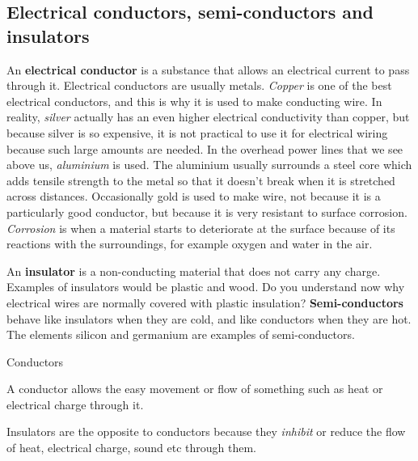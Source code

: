             \subsection{ Electrical conductors, semi-conductors and insulators}
            \nopagebreak
            \label{m38706*id66058}An \textbf{electrical conductor} is a substance that allows an electrical current to pass through it. Electrical conductors are usually metals. \textsl{Copper} is one of the best electrical conductors, and this is why it is used to make conducting wire. In reality, \textsl{silver} actually has an even higher electrical conductivity than copper, but because silver is so expensive, it is not practical to use it for electrical wiring because such large amounts are needed. In the overhead power lines that we see above us, \textsl{aluminium} is used. The aluminium usually surrounds a steel core which adds tensile strength to the metal so that it doesn't break when it is stretched across distances. Occasionally gold is used to make wire, not because it is a particularly good conductor, but because it is very resistant to surface corrosion. \textsl{Corrosion} is when a material starts to deteriorate at the surface because of its reactions with the surroundings, for example oxygen and water in the air.\par 
      \label{m38706*id66098}An \textbf{insulator} is a non-conducting material that does not carry any charge. Examples of insulators would be plastic and wood. Do you understand now why electrical wires are normally covered with plastic insulation? \textbf{Semi-conductors} behave like insulators when they are cold, and like conductors when they are hot. The elements silicon and germanium are examples of semi-conductors.\par 
\Definition
{Conductors} 
{A conductor allows the easy movement or flow of something such as heat or electrical charge through it.  \par 
       } 
{Insulators are the opposite to conductors because they \textsl{inhibit} or reduce the flow of heat, electrical charge, sound etc through them. \par}

